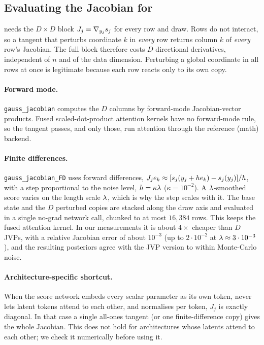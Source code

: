 \subsection{Evaluating the Jacobian for \quiver}\label{sec:impl-jacobian}

\quiver{} needs the $D\times D$ block $J_j=\nabla_{y_j}s_j$ for every row and draw.
Rows do not interact, so a tangent that perturbs coordinate $k$ in \emph{every} row returns column $k$ of \emph{every} row's Jacobian.
The full block therefore costs $D$ directional derivatives, independent of $n$ and of the data dimension.
Perturbing a global coordinate in all rows at once is legitimate because each row reacts only to its own copy.

\paragraph{Forward mode.}
\texttt{gauss\_jacobian} computes the $D$ columns by forward-mode Jacobian-vector products.
Fused scaled-dot-product attention kernels have no forward-mode rule, so the tangent passes, and only those, run attention through the reference (math) backend.

\paragraph{Finite differences.}
\texttt{gauss\_jacobian\_FD} uses forward differences, $J_j e_k\approx[s_j(y_j+h e_k)-s_j(y_j)]/h$, with a step proportional to the noise level, $h=\kappa\lambda$ ($\kappa=10^{-2}$).
A $\lambda$-smoothed score varies on the length scale $\lambda$, which is why the step scales with it.
The base state and the $D$ perturbed copies are stacked along the draw axis and evaluated in a single no-grad network call, chunked to at most $16{,}384$ rows.
This keeps the fused attention kernel.
In our measurements it is about $4\times$ cheaper than $D$ JVPs, with a relative Jacobian error of about $10^{-3}$ (up to $2\cdot10^{-2}$ at $\lambda\approx3\cdot10^{-3}$), and the resulting posteriors agree with the JVP version to within Monte-Carlo noise.

\paragraph{Architecture-specific shortcut.}
When the score network embeds every scalar parameter as its own token, never lets latent tokens attend to each other, and normalises per token, $J_j$ is exactly diagonal.
In that case a single all-ones tangent (or one finite-difference copy) gives the whole Jacobian.
This does not hold for architectures whose latents attend to each other; we check it numerically before using it.

